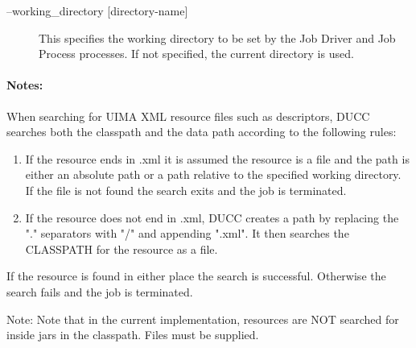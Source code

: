\begin{description}
        \item[--working\_directory {[directory-name]}]
          This specifies the working directory to be set by the Job Driver and Job Process processes. 
          If not specified, the current directory is used.
    \end{description}
        
    \paragraph{Notes:}
    When searching for UIMA XML resource files such as descriptors, DUCC searches both the 
    classpath and the data path according to the following rules: 

    \begin{enumerate}
        \item If the resource ends in .xml it is assumed the resource is a file and the path is either
          an absolute path or a path relative to the specified working directory. If the file is not
          found the search exits and the job is terminated.

        \item If the resource does not end in .xml, DUCC creates a path by replacing the "." 
          separators with "/" and appending ".xml". It then searches the CLASSPATH for the 
          resource as a file. 
    \end{enumerate}

    If the resource is found in either place the search is successful. Otherwise the search 
    fails and the job is terminated. 

    Note: Note that in the current implementation, resources are NOT searched    
    for inside jars in the classpath. Files must be supplied. 

